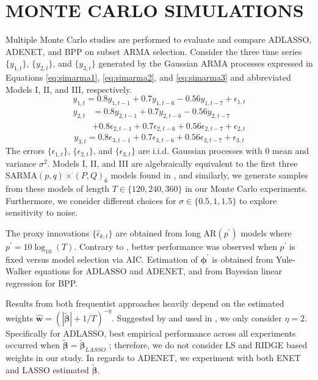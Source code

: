\section{MONTE CARLO SIMULATIONS}
\label{sec:mc}
Multiple Monte Carlo studies are performed to evaluate and compare ADLASSO, ADENET, and BPP on subset ARMA selection. Consider the three time series $\{y_{1,t}\}$, $\{y_{2,t}\}$, and $\{y_{3,t}\}$ generated by the Gaussian ARMA processes expressed in Equations \ref{eq:simarma1}, \ref{eq:simarma2}, and \ref{eq:simarma3} and abbreviated Models I, II, and III, respectively.
\begin{equation}
	\label{eq:simarma1}
	y_{1,t}=0.8y_{1,t-1}+0.7y_{1,t-6}-0.56y_{1,t-7}+\epsilon_{1,t}
\end{equation}
\begin{equation}
	\begin{split}
	\label{eq:simarma2}
	y_{2,t}&=0.8y_{2,t-1}+0.7y_{2,t-6}-0.56y_{2,t-7}\\
	&+0.8\epsilon_{2,t-1}+0.7\epsilon_{2,t-6}+0.56\epsilon_{2,t-7}+\epsilon_{2,t}
	\end{split}
\end{equation}
\begin{equation}
	\label{eq:simarma3}
	y_{3,t}=0.8\epsilon_{3,t-1}+0.7\epsilon_{3,t-6}+0.56\epsilon_{3,t-7}+\epsilon_{3,t}
\end{equation}
The errors $\{\epsilon_{1,t}\}$, $\{\epsilon_{2,t}\}$, and $\{\epsilon_{3,t}\}$ are i.i.d. Gaussian processes with $0$ mean and variance $\sigma^2$. Models I, II, and III are algebraically equivalent to the first three SARMA$(p,q)\times(P,Q)_6$ models found in \cite{Chen2011}, and similarly, we generate samples from these models of length $T\in \{120, 240, 360\}$ in our Monte Carlo experiments. Furthermore, we consider different choices for $\sigma\in\{0.5,1,1.5\}$ to explore sensitivity to noise. 

The proxy innovations $\{\hat{\epsilon}_{k,t}\}$ are obtained from long AR$(p^\prime)$ models where $p^\prime=10\log_{10}(T)$. Contrary to \cite{Chen2011}, better performance was observed when $p^\prime$ is fixed versus model selection via AIC. Estimation of $\bm{\phi}^\prime$ is obtained from Yule-Walker equations for ADLASSO and ADENET, and from Bayesian linear regression for BPP.

Results from both frequentist approaches heavily depend on the estimated weights $\hat{\bm{w}}=(|\tilde{\bm{\beta}}|+1/T)^{-\eta}$. Suggested by \cite{Zou2006} and used in \cite{Chen2011}, we only consider $\eta=2$. Specifically for ADLASSO, best empirical performance across all experiments occurred when $\tilde{\bm{\beta}}=\tilde{\bm{\beta}}_{LASSO}$ \citep{Chen2011}; therefore, we do not consider LS and RIDGE based weights in our study. In regards to ADENET, we experiment with both ENET and LASSO estimated $\tilde{\bm{\beta}}$.










